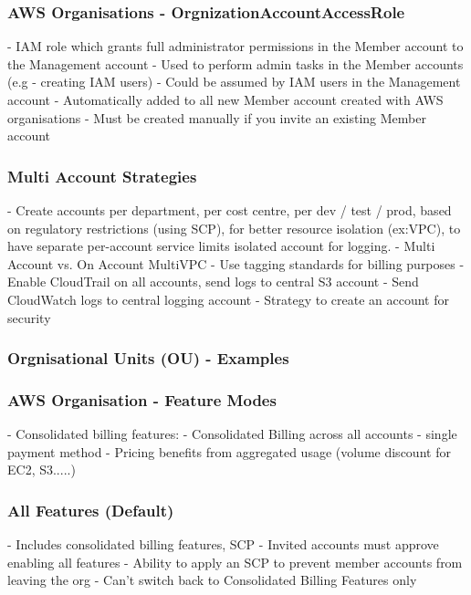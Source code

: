 \documentclass[11pt]{book}
\begin{document}
    \subsubsection{AWS Organisations - OrgnizationAccountAccessRole}
    - IAM role which grants full administrator permissions in the Member account to the Management account
    - Used to perform admin tasks in the Member accounts (e.g - creating IAM users)
    - Could be assumed by IAM users in the Management account
    - Automatically added to all new Member account created with AWS organisations
    - Must be created manually if you invite an existing Member account

    \subsubsection{Multi Account Strategies}
    - Create accounts per department, per cost centre, per dev / test / prod, based on regulatory restrictions (using SCP), for better resource isolation (ex:VPC), to have separate per-account service limits isolated account for logging.
    - Multi Account vs. On Account MultiVPC
    - Use tagging standards for billing purposes
    - Enable CloudTrail on all accounts, send logs to central S3 account
    - Send CloudWatch logs to central logging account
    - Strategy to create an account for security

    \subsubsection{Orgnisational Units (OU) - Examples}

    \subsubsection{AWS Organisation - Feature Modes}
    - Consolidated billing features:
    - Consolidated Billing across all accounts - single payment method
    - Pricing benefits from aggregated usage (volume discount for EC2, S3.....)

    \subsubsection{All Features (Default)}
    - Includes consolidated billing features, SCP
    - Invited accounts must approve enabling all features
    - Ability to apply an SCP to prevent member accounts from leaving the org
    - Can't switch back to Consolidated Billing Features only
\end{document}

